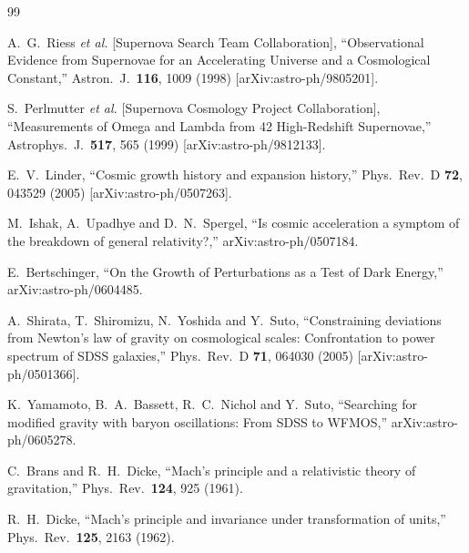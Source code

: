 \begin{thebibliography}{99}


  A.~G.~Riess {\it et al.}  [Supernova Search Team Collaboration],
   ``Observational Evidence from Supernovae for an Accelerating Universe and a
	Cosmological Constant,''
  Astron.\ J.\  {\bf 116}, 1009 (1998)
  [arXiv:astro-ph/9805201].

  S.~Perlmutter {\it et al.}  [Supernova Cosmology Project Collaboration],
  ``Measurements of Omega and Lambda from 42 High-Redshift Supernovae,''
  Astrophys.\ J.\  {\bf 517}, 565 (1999)
  [arXiv:astro-ph/9812133].

  E.~V.~Linder,
  ``Cosmic growth history and expansion history,''
  Phys.\ Rev.\ D {\bf 72}, 043529 (2005)
  [arXiv:astro-ph/0507263].

  M.~Ishak, A.~Upadhye and D.~N.~Spergel,
   ``Is cosmic acceleration a symptom of the breakdown of general
  relativity?,''
  arXiv:astro-ph/0507184.

  E.~Bertschinger,
  ``On the Growth of Perturbations as a Test of Dark Energy,''
  arXiv:astro-ph/0604485.

  A.~Shirata, T.~Shiromizu, N.~Yoshida and Y.~Suto,
   ``Constraining deviations from Newton's law of gravity on cosmological
  scales: Confrontation to power spectrum of SDSS galaxies,''
  Phys.\ Rev.\ D {\bf 71}, 064030 (2005)
  [arXiv:astro-ph/0501366].

  K.~Yamamoto, B.~A.~Bassett, R.~C.~Nichol and Y.~Suto,
   ``Searching for modified gravity with baryon oscillations: From SDSS to
  WFMOS,''
  arXiv:astro-ph/0605278.

  C.~Brans and R.~H.~Dicke,
  ``Mach's principle and a relativistic theory of gravitation,''
  Phys.\ Rev.\  {\bf 124}, 925 (1961).

  R.~H.~Dicke,
  ``Mach's principle and invariance under transformation of units,''
  Phys.\ Rev.\  {\bf 125}, 2163 (1962).


\end{thebibliography}
